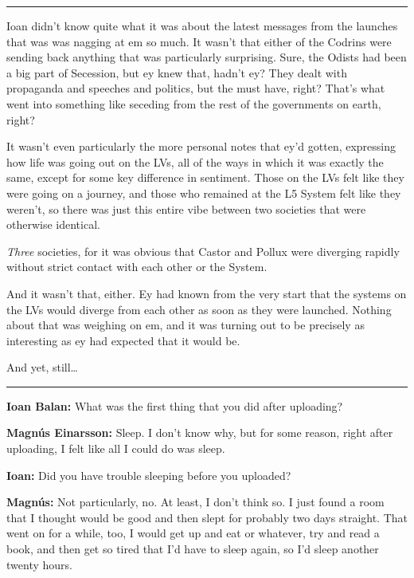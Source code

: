 \begin{center}\rule{0.5\linewidth}{0.5pt}\end{center}

Ioan didn't know quite what it was about the latest messages from the launches that was was nagging at em so much. It wasn't that either of the Codrins were sending back anything that was particularly surprising. Sure, the Odists had been a big part of Secession, but ey knew that, hadn't ey? They dealt with propaganda and speeches and politics, but the must have, right? That's what went into something like seceding from the rest of the governments on earth, right?

It wasn't even particularly the more personal notes that ey'd gotten, expressing how life was going out on the LVs, all of the ways in which it was exactly the same, except for some key difference in sentiment. Those on the LVs felt like they were going on a journey, and those who remained at the L5 System felt like they weren't, so there was just this entire vibe between two societies that were otherwise identical.

\emph{Three} societies, for it was obvious that Castor and Pollux were diverging rapidly without strict contact with each other or the System.

And it wasn't that, either. Ey had known from the very start that the systems on the LVs would diverge from each other as soon as they were launched. Nothing about that was weighing on em, and it was turning out to be precisely as interesting as ey had expected that it would be.

And yet, still\ldots{}

\begin{center}\rule{0.5\linewidth}{0.5pt}\end{center}

\textbf{Ioan Balan:} What was the first thing that you did after uploading?

\textbf{Magnús Einarsson:} Sleep. I don't know why, but for some reason, right after uploading, I felt like all I could do was sleep.

\textbf{Ioan:} Did you have trouble sleeping before you uploaded?

\textbf{Magnús:} Not particularly, no. At least, I don't think so. I just found a room that I thought would be good and then slept for probably two days straight. That went on for a while, too, I would get up and eat or whatever, try and read a book, and then get so tired that I'd have to sleep again, so I'd sleep another twenty hours.

